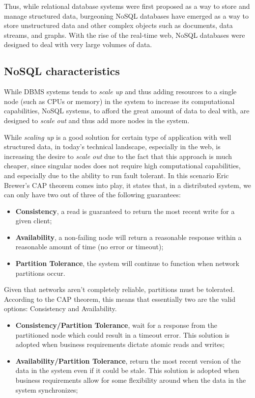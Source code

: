 \noindent Thus, while relational database systems were first proposed as a way to store and manage structured data, burgeoning NoSQL databases have emerged as a way to store unstructured data and other complex objects such as documents, data streams, and graphs. With the rise of the real-time web, NoSQL databases were designed to deal with very large volumes of data.

\subsection{NoSQL characteristics}
While DBMS systems tends to \textit{scale up} and thus adding resources to a single node (such as CPUs or memory) in the system to increase its computational capabilities, NoSQL systems, to afford the great amount of data to deal with, are designed to \textit{scale out} and thus add more nodes in the system.

\noindent While \textit{scaling up} is a good solution for certain type of application with well structured data, in today's technical landscape, especially in the web, is increasing the desire to \textit{scale out} due to the fact that this approach is much cheaper, since singular nodes does not require high computational capabilities, and especially due to the ability to run fault tolerant.
In this scenario Eric Brewer’s CAP theorem comes into play, it states that, in a distributed system, we can only have two out of three of the following guarantees:
\begin{itemize}
\item \textbf{Consistency}, a read is guaranteed to return the most recent write for a given client;
\item \textbf{Availability}, a non-failing node will return a reasonable response within a reasonable amount of time (no error or timeout);
\item \textbf{Partition Tolerance}, the system will continue to function when network partitions occur.
\end{itemize}

\noindent Given that networks aren't completely reliable, partitions must be tolerated. According to the CAP theorem, this means that essentially two are the valid options: Consistency and Availability.
\begin{itemize}
\item \textbf{Consistency/Partition Tolerance}, wait for a response from the partitioned node which could result in a timeout error. This solution is adopted when business requirements dictate atomic reads and writes;
\item \textbf{Availability/Partition Tolerance}, return the most recent version of the data in the system even if it could be stale. This solution is adopted when business requirements allow for some flexibility around when the data in the system synchronizes;
\end{itemize}


